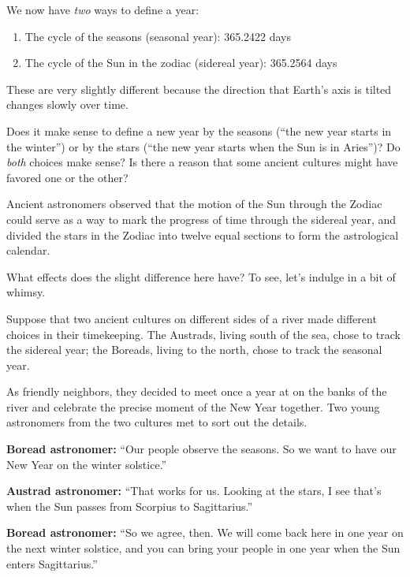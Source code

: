 \documentclass[11pt]{article}
\begin{document}
\vspace{1.8in}
\underline{\hspace{6in}}

We now have {\it two} ways to define a year: 

\begin{enumerate}
	\item The cycle of the seasons (seasonal year): 365.2422 days
	\item The cycle of the Sun in the zodiac (sidereal year): 365.2564 days
\end{enumerate}

These are very slightly different because the direction that Earth's axis is tilted changes slowly over time. 

Does it make sense to define a new year by the seasons (``the new year starts in the winter'') or by the stars (``the new year starts when the Sun is in Aries'')? Do {\it both} choices make sense? Is there a reason that some ancient cultures might have favored one or the other?


\vspace{1.8in}
\underline{\hspace{6in}}

Ancient astronomers observed that the motion of the Sun through the Zodiac could serve as a way to mark the progress of time through the sidereal year, and divided the stars in the Zodiac into twelve equal sections to form the astrological calendar. 

What effects does the slight difference here have? To see, let's indulge in a bit of whimsy.

Suppose that two ancient cultures on different sides of a river made different choices in their timekeeping. The Austrads, living south of the sea, chose to track the sidereal year; the Boreads, living to the north, chose to track the seasonal year. 

As friendly neighbors, they decided to meet once a year at on the banks of the river and celebrate the precise moment of the New Year together. Two young astronomers from the two cultures met to sort out the details. 

\vspace{1em}

\hspace{0.05\textwidth}
\begin{minipage}{0.9\textwidth}
{\bf Boread astronomer:} ``Our people observe the seasons. So we want to have our New Year on the winter solstice.''

\medskip

{\bf Austrad astronomer:} ``That works for us. Looking at the stars, I see that's when the Sun passes from Scorpius to Sagittarius.''

\medskip

{\bf Boread astronomer:} ``So we agree, then. We will come back here in one year on the next winter solstice, and you can bring your people in one year when the Sun enters Sagittarius.''
\end{minipage}
\end{document}
